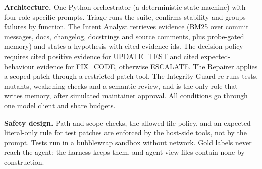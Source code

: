 \documentclass[10pt,a4paper]{article}
\begin{document}
\textbf{Architecture.} One Python orchestrator (a deterministic state machine) with four role-specific prompts. Triage runs the suite, confirms stability and groups failures by function. The Intent Analyst retrieves evidence (BM25 over commit messages, docs, changelog, docstrings and source comments, plus probe-gated memory) and states a hypothesis with cited evidence ids. The decision policy requires cited positive evidence for UPDATE\_TEST and cited expected-behaviour evidence for FIX\_CODE, otherwise ESCALATE. The Repairer applies a scoped patch through a restricted patch tool. The Integrity Guard re-runs tests, mutants, weakening checks and a semantic review, and is the only role that writes memory, after simulated maintainer approval. All conditions go through one model client and share budgets.

\textbf{Safety design.} Path and scope checks, the allowed-file policy, and an expected-literal-only rule for test patches are enforced by the host-side tools, not by the prompt. Tests run in a bubblewrap sandbox without network. Gold labels never reach the agent: the harness keeps them, and agent-view files contain none by construction.
\end{document}
